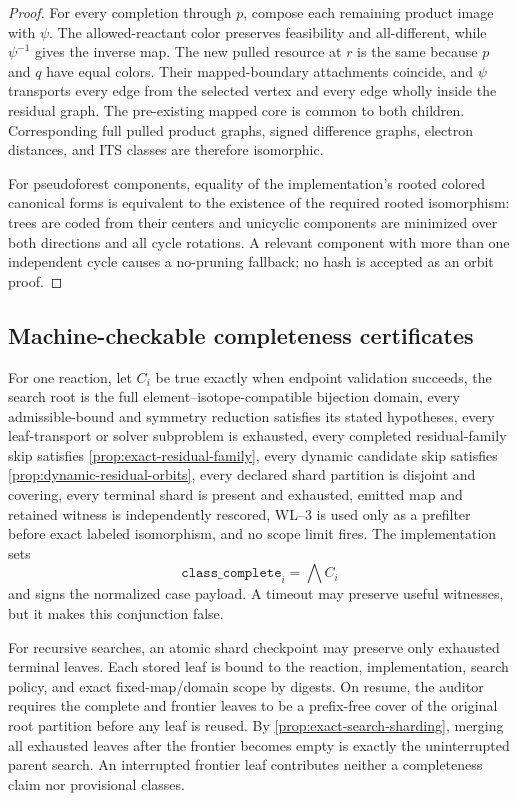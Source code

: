 \begin{proof}
For every completion through $p$, compose each remaining product image with
$\psi$.  The allowed-reactant color preserves feasibility and all-different,
while $\psi^{-1}$ gives the inverse map.  The new pulled resource at $r$ is
the same because $p$ and $q$ have equal colors.  Their mapped-boundary
attachments coincide, and $\psi$ transports every edge from the selected
vertex and every edge wholly inside the residual graph.  The pre-existing
mapped core is common to both children.  Corresponding full pulled product
graphs, signed difference graphs, electron distances, and ITS classes are
therefore isomorphic.

For pseudoforest components, equality of the implementation's rooted colored
canonical forms is equivalent to the existence of the required rooted
isomorphism: trees are coded from their centers and unicyclic components are
minimized over both directions and all cycle rotations.  A relevant component
with more than one independent cycle causes a no-pruning fallback; no hash is
accepted as an orbit proof.
\end{proof}

\subsection{Machine-checkable completeness certificates}
\label{sec:certificate-contract}

For one reaction, let $C_i$ be true exactly when endpoint validation succeeds,
the search root is the full element--isotope-compatible bijection domain,
every admissible-bound and symmetry reduction satisfies its stated
hypotheses, every leaf-transport or solver subproblem is exhausted, every
completed residual-family skip satisfies
\cref{prop:exact-residual-family}, every dynamic candidate skip satisfies
\cref{prop:dynamic-residual-orbits}, every
declared shard partition is disjoint and covering, every terminal shard is
present and exhausted,
emitted map and retained witness is independently rescored, WL--3 is used
only as a prefilter before exact labeled isomorphism, and no scope limit
fires.  The implementation sets
\[
  \texttt{class\_complete}_i
  =
  \bigwedge C_i
\]
and signs the normalized case payload.  A timeout may preserve useful
witnesses, but it makes this conjunction false.

For recursive searches, an atomic shard checkpoint may preserve only exhausted
terminal leaves.  Each stored leaf is bound to the reaction, implementation,
search policy, and exact fixed-map/domain scope by digests.  On resume, the
auditor requires the complete and frontier leaves to be a prefix-free cover of
the original root partition before any leaf is reused.  By
\cref{prop:exact-search-sharding}, merging all exhausted leaves after the
frontier becomes empty is exactly the uninterrupted parent search.  An
interrupted frontier leaf contributes neither a completeness claim nor
provisional classes.

